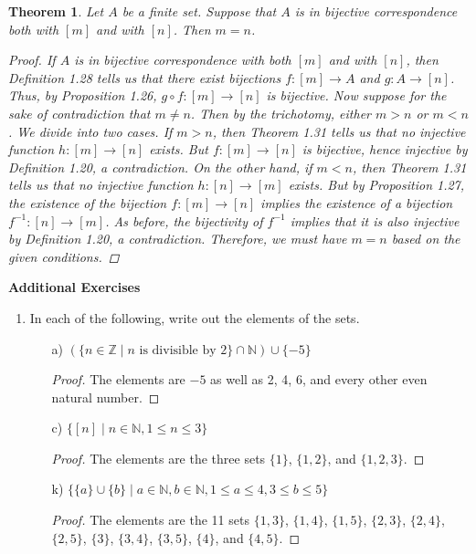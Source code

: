 \documentclass[titlepage]{article}
\newcounter{script}
\newtheorem{theorem}{Theorem}[script]
\theoremstyle{definition}
\newcommand{\N}{\mathbb{N}}
\newcommand{\Z}{\mathbb{Z}}
\begin{document}
\setcounter{theorem}{31}

\begin{theorem}
    Let $A$ be a finite set. Suppose that $A$ is in bijective correspondence both with $[m]$ and with $[n]$. Then $m=n$.
    \begin{proof}
        If $A$ is in bijective correspondence with both $[m]$ and with $[n]$, then Definition 1.28 tells us that there exist bijections $f:[m]\to A$ and $g:A\to[n]$. Thus, by Proposition 1.26, $g\circ f:[m]\to[n]$ is bijective. Now suppose for the sake of contradiction that $m\neq n$. Then by the trichotomy, either $m>n$ or $m<n$. We divide into two cases. If $m>n$, then Theorem 1.31 tells us that no injective function $h:[m]\to[n]$ exists. But $f:[m]\to[n]$ is bijective, hence injective by Definition 1.20, a contradiction. On the other hand, if $m<n$, then Theorem 1.31 tells us that no injective function $h:[n]\to[m]$ exists. But by Proposition 1.27, the existence of the bijection $f:[m]\to[n]$ implies the existence of a bijection $f^{-1}:[n]\to[m]$. As before, the bijectivity of $f^{-1}$ implies that it is also injective by Definition 1.20, a contradiction. Therefore, we must have $m=n$ based on the given conditions. 
    \end{proof}
\end{theorem}

\noindent\textbf{Additional Exercises}
\begin{enumerate}
    \item In each of the following, write out the elements of the sets.
    \begin{enumerate}
        \item[a)] $(\{n\in\Z\mid n\text{ is divisible by }2\}\cap\N)\cup\{-5\}$
        \begin{proof}
            The elements are $-5$ as well as 2, 4, 6, and every other even natural number.
        \end{proof}
        \item[c)] $\{[n]\mid n\in\N,1\leq n\leq 3\}$
        \begin{proof}
            The elements are the three sets $\{1\}$, $\{1,2\}$, and $\{1,2,3\}$.
        \end{proof}
        \item[k)] $\{\{a\}\cup\{b\}\mid a\in\N,b\in\N,1\leq a\leq 4,3\leq b\leq 5\}$
        \begin{proof}
            The elements are the 11 sets $\{1,3\}$, $\{1,4\}$, $\{1,5\}$, $\{2,3\}$, $\{2,4\}$, $\{2,5\}$, $\{3\}$, $\{3,4\}$, $\{3,5\}$, $\{4\}$, and $\{4,5\}$.
        \end{proof}
    \end{enumerate}
\end{enumerate}
\end{document}

